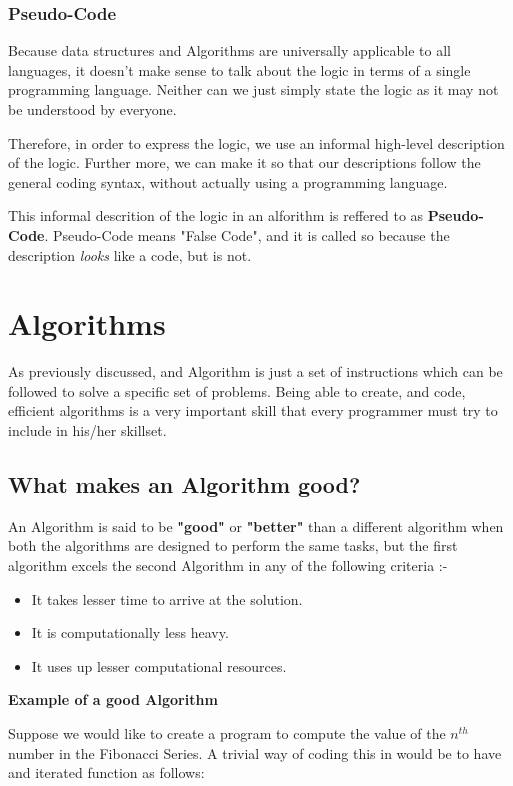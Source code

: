 \documentclass{article}
\theoremstyle{definition}
\theoremstyle{example}
\begin{document}
\subsubsection{\Large Pseudo-Code}
\hspace{4mm}Because data structures and Algorithms are universally applicable to all languages, it doesn't make sense to talk about the logic in terms of a single programming language. Neither can we just simply state the logic as it may not be understood by everyone. \par 
\vspace{4mm}
Therefore, in order to express the logic, we use an informal high-level description of the logic. Further more, we can make it so that our descriptions follow the general coding syntax, without actually using a programming language.\par
\vspace{4mm}
This informal descrition of the logic in an alforithm is reffered to as \textbf{Pseudo-Code}. Pseudo-Code means "False Code", and it is called so because the description \textit{looks} like a code, but is not.


\section{\Large Algorithms}
\hspace{6mm} As previously discussed, and Algorithm is just a set of instructions which can be followed to solve a specific set of problems. Being able to create, and code, efficient algorithms is a very important skill that every programmer must try to include in his/her skillset. \par
\subsection{\Large What makes an Algorithm good?}
\hspace{6mm} An Algorithm is said to be \textbf{"good"} or \textbf{"better"} than a different algorithm when both the algorithms are designed to perform the same tasks, but the first algorithm excels the second Algorithm in any of the following criteria :-
\begin{itemize}
    \item It takes lesser time to arrive at the solution.
    \item It is computationally less heavy.
    \item It uses up lesser computational resources.
\end{itemize}
\vspace{5mm}
\noindent \LARGE \textbf{Example of a good Algorithm} \par
\Large
\vspace{3mm}Suppose we would like to create a program to compute the value of the $n^{th}$ number in the Fibonacci Series. A trivial way of coding this in would be to have and iterated function as follows: \par
\end{document}
